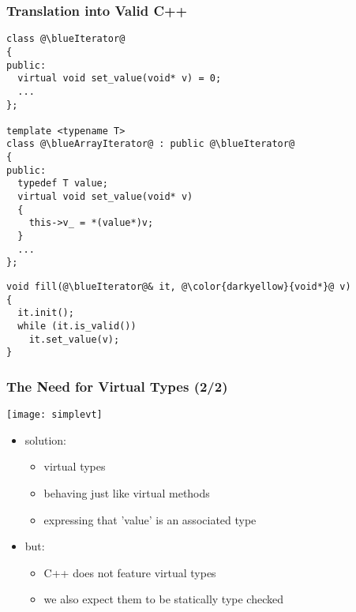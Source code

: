 \begin{frame}[fragile]
  \frametitle{Translation into Valid C++}

\begin{multicols}{2}
%
\begin{lstlisting}[escapechar=@]
class @\blueIterator@
{
public:
  virtual void set_value(void* v) = 0;
  ...
};

template <typename T>
class @\blueArrayIterator@ : public @\blueIterator@
{
public:
  typedef T value;
  virtual void set_value(void* v)
  {
    this->v_ = *(value*)v;
  }
  ...
};
\end{lstlisting}
%
\columnbreak
%
\begin{lstlisting}[escapechar=@]
void fill(@\blueIterator@& it, @\color{darkyellow}{void*}@ v)
{
  it.init();
  while (it.is_valid())
    it.set_value(v);
}
\end{lstlisting}
%
\end{multicols}

\end{frame}




\begin{frame}
  \frametitle{The Need for Virtual Types (2/2)}

\begin{multicols}{2}
%
  \begin{center}
    \texttt{[image: simplevt]}
  \end{center}
%
\columnbreak
%
\begin{itemize}
\item solution:
  \begin{itemize}
  \item virtual types
  \item behaving just like virtual methods
  \item expressing that 'value' is an associated type
  \end{itemize}
\smallskip
\item but:
  \begin{itemize}
  \item C++ does not feature virtual types
  \item we also expect them to be statically type checked
  \end{itemize}
\end{itemize}
%
\end{multicols}

\end{frame}




